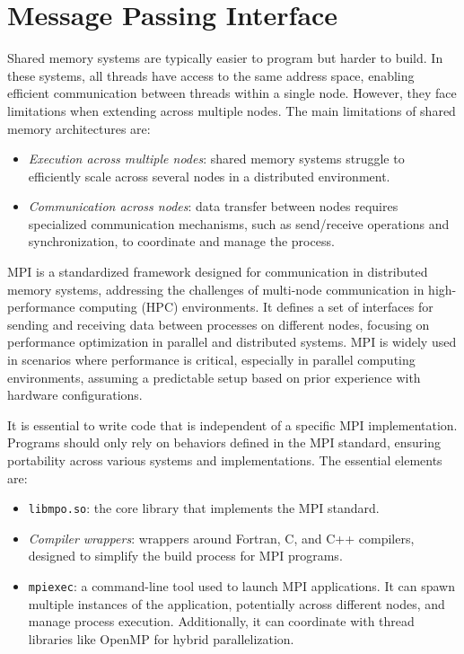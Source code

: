 \section{Message Passing Interface}

Shared memory systems are typically easier to program but harder to build. 
In these systems, all threads have access to the same address space, enabling efficient communication between threads within a single node. 
However, they face limitations when extending across multiple nodes.
The main limitations of shared memory architectures are: 
\begin{itemize}
    \item \textit{Execution across multiple nodes}: shared memory systems struggle to efficiently scale across several nodes in a distributed environment.
    \item \textit{Communication across nodes}: data transfer between nodes requires specialized communication mechanisms, such as send/receive operations and synchronization, to coordinate and manage the process.
\end{itemize}

MPI is a standardized framework designed for communication in distributed memory systems, addressing the challenges of multi-node communication in high-performance computing (HPC) environments.
It defines a set of interfaces for sending and receiving data between processes on different nodes, focusing on performance optimization in parallel and distributed systems.
MPI is widely used in scenarios where performance is critical, especially in parallel computing environments, assuming a predictable setup based on prior experience with hardware configurations.

It is essential to write code that is independent of a specific MPI implementation. 
Programs should only rely on behaviors defined in the MPI standard, ensuring portability across various systems and implementations.
The essential elements are: 
\begin{itemize}
    \item \texttt{libmpo.so}: the core library that implements the MPI standard.
    \item \textit{Compiler wrappers}: wrappers around Fortran, C, and C++ compilers, designed to simplify the build process for MPI programs.
    \item \texttt{mpiexec}: a command-line tool used to launch MPI applications. 
        It can spawn multiple instances of the application, potentially across different nodes, and manage process execution. 
        Additionally, it can coordinate with thread libraries like OpenMP for hybrid parallelization.
\end{itemize}

